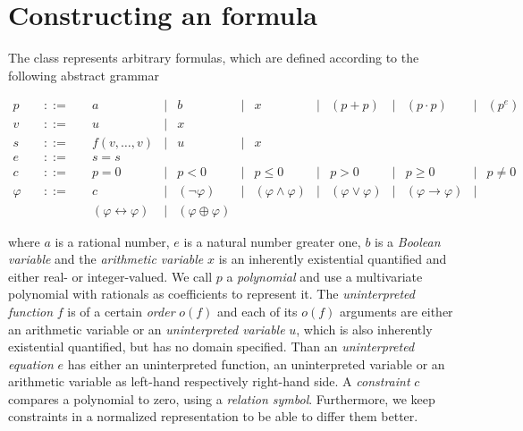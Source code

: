 \chapter{Constructing an \SmtratLogic formula}
\label{chapter:constructingaformula}
The class \formulaClass represents arbitrary \SmtratLogic formulas, which are
defined according to the following abstract grammar

\[
\begin{array}{rccccccccccccc}
  p &\quad ::=\quad & a & | & b & | & x & | & (p + p) & | & (p \cdot p) & | & (p^e) \\
  v &\quad ::=\quad & u & | & x \\
  s &\quad ::=\quad & f(v,\ldots,v) & | & u & | & x \\
  e &\quad ::=\quad & s = s \\
  c &\quad ::=\quad & p = 0 & | & p < 0 & | & p \leq 0 & | & p > 0 & | & p \geq 0 & | & p \neq 0 \\
 \varphi &\quad ::=\quad & c & | & (\neg \varphi) & | &
 (\varphi\land\varphi) & | &
 (\varphi\lor\varphi) & | & 
 (\varphi\rightarrow\varphi) & | \\ &&
 (\varphi\leftrightarrow\varphi) & | &
 (\varphi\oplus\varphi)
\end{array}
\]

where $a$ is a rational number, $e$ is a natural number greater one, $b$ is a \emph{Boolean variable} and the \emph{arithmetic variable} $x$ is an inherently existential quantified and either real- or integer-valued. We call $p$ a \emph{polynomial} and use a \carl multivariate polynomial with \cln rationals as coefficients to represent it. The \emph{uninterpreted function} $f$ is of a certain \emph{order} $o(f)$ and each of its $o(f)$ arguments are either an arithmetic variable or an \emph{uninterpreted variable} $u$, which is also inherently existential quantified, but has no domain specified. Than an \emph{uninterpreted equation} $e$ has either an uninterpreted function, an uninterpreted variable or an arithmetic variable as left-hand respectively right-hand side. A \emph{constraint} $c$ compares a polynomial to zero, using a \emph{relation symbol}. Furthermore, we keep constraints in a normalized representation to be able to differ them better.

